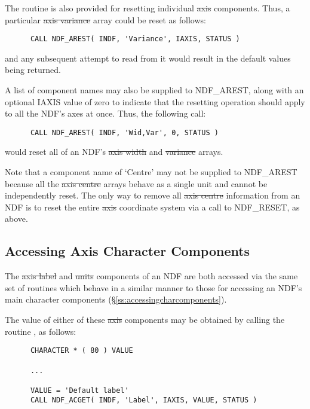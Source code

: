 The routine  is also provided for resetting individual \st{axis\/} components. 
Thus, a particular \st{axis variance\/} array could be reset as follows: 

\small
\begin{verbatim}
      CALL NDF_AREST( INDF, 'Variance', IAXIS, STATUS )
\end{verbatim}
\normalsize

and any subsequent attempt to read from it would result in the default
values being returned. 

A list of component names may also be supplied to NDF\_AREST, along with an
optional IAXIS value of zero to indicate that the resetting operation should
apply to all the NDF's axes at once. 
Thus, the following call:

\small
\begin{verbatim}
      CALL NDF_AREST( INDF, 'Wid,Var', 0, STATUS )
\end{verbatim}
\normalsize

would reset all of an NDF's \st{axis width\/} and \st{variance\/} arrays.

Note that a component name of `Centre' may not be supplied to
NDF\_AREST because all the \st{axis centre\/} arrays behave as a single 
unit and cannot be independently reset.
The only way to remove all \st{axis centre\/} information from an NDF is to
reset the entire \st{axis\/} coordinate system via a call to NDF\_RESET, as 
above.

\subsection{\label{ss:acmsg}Accessing Axis Character Components}

The \st{axis label\/} and \st{units\/} components of an NDF are both
accessed via the same set of routines which behave in a similar manner to
those for accessing an NDF's main character components 
(\S\ref{ss:accessingcharcomponents}). 

The value of either of these \st{axis\/} components may be obtained by
calling the routine , as follows: 

\small
\begin{verbatim}
      CHARACTER * ( 80 ) VALUE

      ...

      VALUE = 'Default label'
      CALL NDF_ACGET( INDF, 'Label', IAXIS, VALUE, STATUS )
\end{verbatim}
\normalsize

